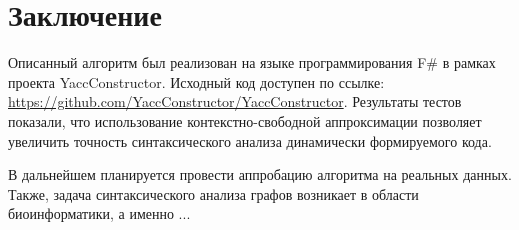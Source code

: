 \section{Заключение}

Описанный алгоритм был реализован на языке программирования F$\#$ в рамках проекта YaccConstructor. Исходный код доступен по ссылке: \url{ https://github.com/YaccConstructor/YaccConstructor}. Результаты тестов показали, что использование контекстно-свободной аппроксимации позволяет увеличить точность синтаксического анализа динамически формируемого кода.

В дальнейшем планируется провести аппробацию алгоритма на реальных данных. Также, задача синтаксического анализа графов возникает в области биоинформатики, а именно ...